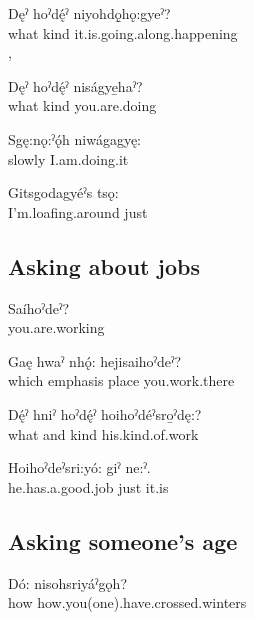 \ea
\gll Dęˀ hoˀdę́ˀ niyohdǫ̱hǫ:gyeˀ?\\
what kind it.is.going.along.happening\\
\glt {}, 
\z 

\ea
\gll Dęˀ hoˀdę́ˀ niságye̱haˀ?\\
what kind you.are.doing\\
\glt {}
\z 

\ea 
\gll Sgę:nǫ:ˀǫ́h niwágagyę:\\
slowly I.am.doing.it\\
\glt {}
\z 

\ea
\gll Gitsgodagyéˀs tsǫ:\\
I'm.loafing.around just\\
\glt {}
\z





\subsection{Asking about jobs}


\ea 
\gll Saíhoˀdeˀ?\\
you.are.working\\
\glt {}
\z

\ea 
\gll Gaę hwaˀ nhǫ́: hejisaihoˀdeˀ?\\
which emphasis place you.work.there\\
\glt {}
\z 

\ea 
\gll Dę́ˀ hniˀ hoˀdę́ˀ hoihoˀdéˀsro̱ˀdę:?\\
what and kind his.kind.of.work\\
\glt {}
\z 

\ea 
\gll Hoihoˀdeˀsri:yó: giˀ ne:ˀ.\\
he.has.a.good.job just it.is\\
\glt {}
\z



\subsection{Asking someone’s age}


\ea 
\gll Dó: nisohsriyáˀgǫh?\\
how how.you(one).have.crossed.winters\\
\glt {}
\z 

